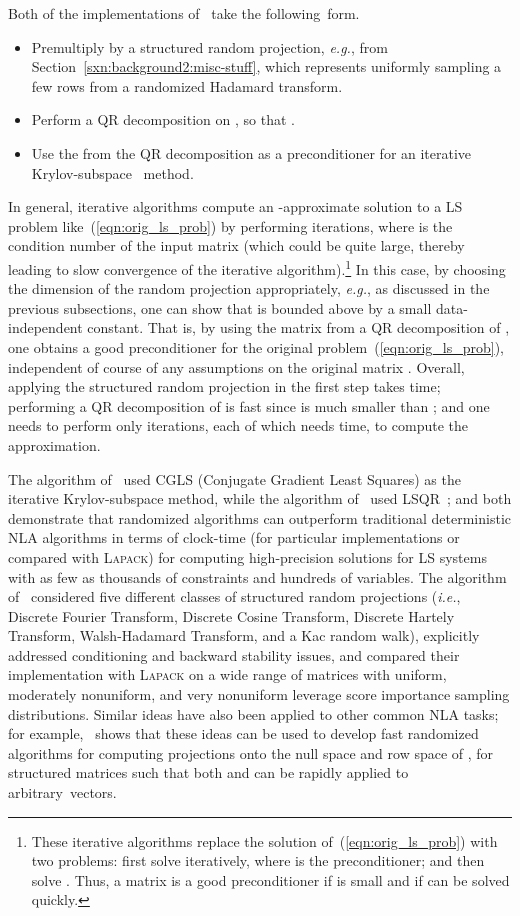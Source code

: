 \documentclass[twoside]{article}
\begin{document}
Both of the implementations of~\cite{RT08,AMT10} take the following~form.
\begin{itemize}
\item
Premultiply  by a structured random projection, \emph{e.g.}, 
 from Section~\ref{sxn:background2:misc-stuff}, which 
represents uniformly sampling a few rows from a randomized Hadamard 
transform.
\item
Perform a QR decomposition on , so that .
\item
Use the  from the QR decomposition as a preconditioner for an iterative
Krylov-subspace~\cite{GVL96} method.
\end{itemize}
In general, iterative algorithms compute an -approximate solution 
to a LS problem like~(\ref{eqn:orig_ls_prob}) by performing 
 iterations, where 
 is the 
condition number of the input matrix (which could be quite large, thereby 
leading to slow convergence of the iterative algorithm).\footnote{These iterative algorithms replace the solution 
of~(\ref{eqn:orig_ls_prob}) with two problems: first solve 
 iteratively, 
where  is the preconditioner; and then solve .
Thus, a matrix  is a good preconditioner if  
is small and if  can be solved quickly.}
In this case, by choosing the dimension of the random projection 
appropriately, \emph{e.g.}, as discussed in the previous subsections, one 
can show that  is bounded above by a small data-independent 
constant.
That is, by using the  matrix from a QR decomposition of , one 
obtains a good preconditioner for the original 
problem~(\ref{eqn:orig_ls_prob}), independent of course of any assumptions 
on the original matrix .
Overall, 
applying the structured random projection in the first step takes  
time; 
performing a QR decomposition of  is fast since  is much 
smaller than ; 
and one needs to perform only  iterations, each of 
which needs  time, to compute the approximation.

The algorithm of~\cite{RT08} used CGLS (Conjugate Gradient Least Squares) as the iterative Krylov-subspace 
method, while the algorithm of~\cite{AMT10} used LSQR~\cite{PS82}; and both demonstrate 
that randomized algorithms can outperform traditional deterministic NLA 
algorithms in terms of clock-time (for particular implementations or 
compared with \textsc{Lapack}) for computing high-precision solutions 
for LS systems with as few as thousands of constraints and hundreds of 
variables.
The algorithm of~\cite{AMT10} 
considered five different classes of structured random projections 
(\emph{i.e.}, Discrete Fourier Transform, Discrete Cosine Transform, 
Discrete Hartely Transform, Walsh-Hadamard Transform, and a Kac random 
walk), explicitly addressed conditioning and backward stability issues, and
compared their implementation with \textsc{Lapack} on a wide range of 
matrices with uniform, moderately nonuniform, and very nonuniform leverage
score importance sampling distributions.
Similar ideas have also been applied to other common NLA tasks; for 
example,~\cite{CRT11} shows that these ideas can be used to develop fast 
randomized algorithms for computing projections onto the null space and row
space of , for structured matrices  such that both  and  can 
be rapidly applied to arbitrary~vectors.
\end{document}
